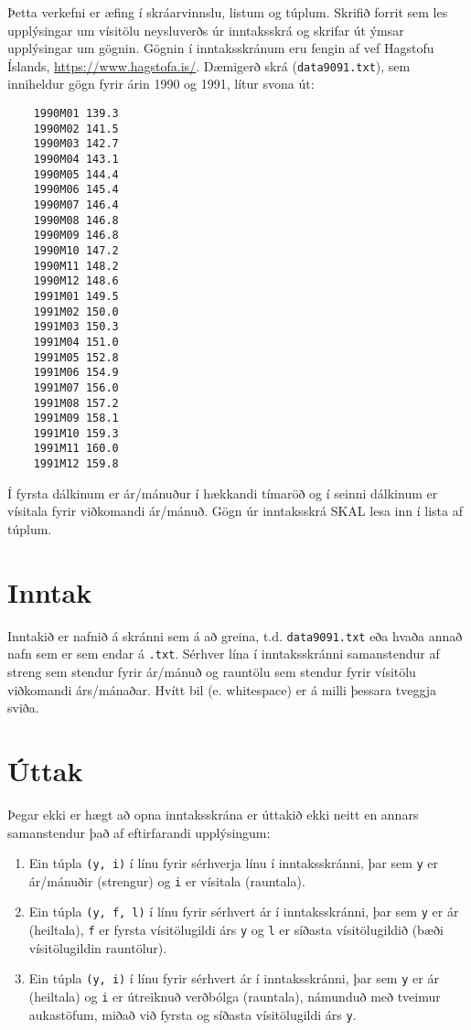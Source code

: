 
Þetta verkefni er æfing í skráarvinnslu, listum og túplum.
Skrifið forrit sem les upplýsingar um vísitölu neysluverðs úr inntaksskrá og skrifar út ýmsar upplýsingar um gögnin.
Gögnin í inntaksskránum eru fengin af vef Hagstofu Íslands, \url{https://www.hagstofa.is/}.
Dæmigerð skrá (\texttt{data9091.txt}), sem inniheldur gögn fyrir árin 1990 og 1991, lítur svona út:

\begin{verbatim}
    1990M01	139.3
    1990M02	141.5
    1990M03	142.7
    1990M04	143.1
    1990M05	144.4
    1990M06	145.4
    1990M07	146.4
    1990M08	146.8
    1990M09	146.8
    1990M10	147.2
    1990M11	148.2
    1990M12	148.6
    1991M01	149.5
    1991M02	150.0
    1991M03	150.3
    1991M04	151.0
    1991M05	152.8
    1991M06	154.9
    1991M07	156.0
    1991M08	157.2
    1991M09	158.1
    1991M10	159.3
    1991M11	160.0
    1991M12	159.8    
\end{verbatim}
Í fyrsta dálkinum er ár/mánuður í hækkandi tímaröð og í seinni dálkinum er vísitala fyrir viðkomandi ár/mánuð.
Gögn úr inntaksskrá SKAL lesa inn í lista af túplum.

\section*{Inntak}
Inntakið er nafnið á skránni sem á að greina, t.d. \texttt{data9091.txt} eða hvaða annað nafn sem er sem endar á \texttt{.txt}.
Sérhver lína í inntaksskránni samanstendur af streng sem stendur fyrir ár/mánuð og rauntölu sem stendur fyrir vísitölu viðkomandi árs/mánaðar. 
Hvítt bil (e. whitespace) er á milli þessara tveggja sviða.

\section*{Úttak}
Þegar ekki er hægt að opna inntaksskrána er úttakið ekki neitt en annars samanstendur það af eftirfarandi upplýsingum:
\begin{enumerate}
    \item Ein túpla \texttt{(y, i)} í línu fyrir sérhverja línu í inntaksskránni, þar sem \texttt{y} er ár/mánuðir (strengur) og \texttt{i} er vísitala (rauntala).
    \item Ein túpla \texttt{(y, f, l)} í línu fyrir sérhvert ár í inntaksskránni, þar sem \texttt{y} er ár (heiltala), \texttt{f} er fyrsta vísitölugildi árs \texttt{y} og \texttt{l} er síðasta vísitölugildið (bæði vísitölugildin rauntölur).
    \item Ein túpla \texttt{(y, i)} í línu fyrir sérhvert ár í inntaksskránni, þar sem \texttt{y} er ár (heiltala) og \texttt{i} er útreiknuð verðbólga (rauntala), námunduð með tveimur aukastöfum, miðað við fyrsta og síðasta vísitölugildi árs \texttt{y}.  
\end{enumerate}

